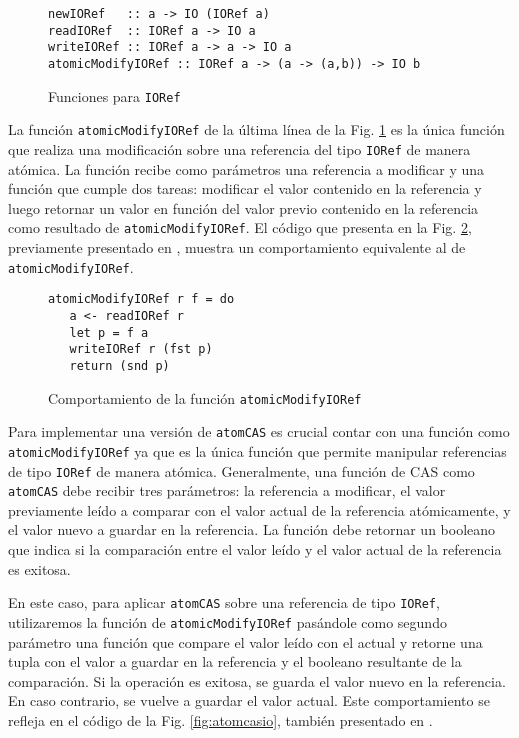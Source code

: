 \begin{figure}[!h]
\centering
\begin{verbatim}
newIORef   :: a -> IO (IORef a)
readIORef  :: IORef a -> IO a
writeIORef :: IORef a -> a -> IO a
atomicModifyIORef :: IORef a -> (a -> (a,b)) -> IO b
\end{verbatim}
\caption{Funciones para \texttt{IORef}}
\label{fig:ioref-interface}
\end{figure}

La función \texttt{atomicModifyIORef} de la última línea de la Fig. \ref{fig:ioref-interface} es la única función que realiza una modificación sobre una referencia del tipo \texttt{IORef} de manera atómica.
La función recibe como parámetros una referencia a modificar y una función que cumple dos tareas: modificar el valor contenido en la referencia y luego retornar un valor en función del valor previo contenido en la referencia como resultado de \texttt{atomicModifyIORef}. El código que presenta en la Fig. \ref{fig:atomicModifyIORef-behavior}, previamente presentado en \cite{linked-list}, muestra un comportamiento equivalente al de \texttt{atomicModifyIORef}.

\begin{figure}[!h]
\centering
\begin{verbatim}
atomicModifyIORef r f = do
   a <- readIORef r
   let p = f a
   writeIORef r (fst p)
   return (snd p)
\end{verbatim}
\caption{Comportamiento de la función \texttt{atomicModifyIORef}}
\label{fig:atomicModifyIORef-behavior}
\end{figure}

Para implementar una versión de \texttt{atomCAS} es crucial contar con una función como \texttt{atomicModifyIORef} ya que es la única función que permite manipular referencias de tipo \texttt{IORef} de manera atómica.
Generalmente, una función de CAS como \texttt{atomCAS} debe recibir tres parámetros: la referencia a modificar, el valor previamente leído a comparar con el valor actual de la referencia atómicamente, y el valor nuevo a guardar en la referencia.
La función debe retornar un booleano que indica si la comparación entre el valor leído y el valor actual de la referencia es exitosa.

En este caso, para aplicar \texttt{atomCAS} sobre una referencia de tipo \texttt{IORef}, utilizaremos la función de \texttt{atomicModifyIORef} pasándole como segundo parámetro una función que compare el valor leído con el actual y retorne una tupla con el valor a guardar en la referencia y el booleano resultante de la comparación.
Si la operación es exitosa, se guarda el valor nuevo en la referencia.
En caso contrario, se vuelve a guardar el valor actual.
Este comportamiento se refleja en el código de la Fig. \ref{fig:atomcasio}, también presentado en \cite{linked-list}.

